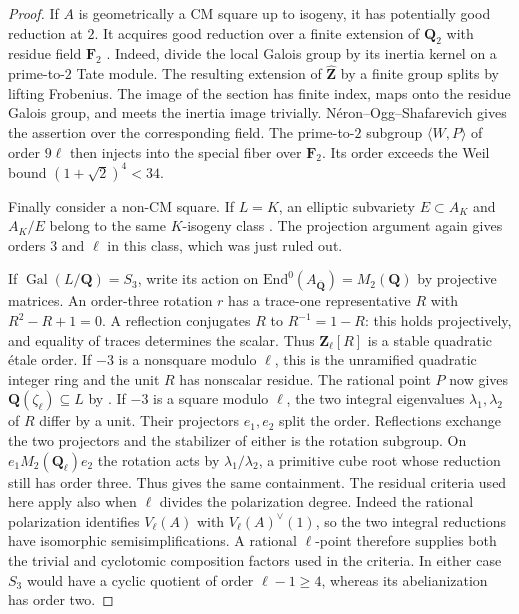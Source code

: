\documentclass[11pt]{article}
\newcommand{\Q}{\mathbf Q}
\newcommand{\Z}{\mathbf Z}
\newcommand{\F}{\mathbf F}
\newcommand{\Gal}{\operatorname{Gal}}
\begin{document}
\begin{proof}
If $A$ is geometrically a CM square up to isogeny, it has potentially good reduction at $2$. It acquires good reduction over a finite extension of $\Q_2$ with residue field $\F_2$ \cite[input (I2)(c)]{T45}. Indeed, divide the local Galois group by its inertia kernel on a prime-to-$2$ Tate module. The resulting extension of $\widehat{\Z}$ by a finite group splits by lifting Frobenius. The image of the section has finite index, maps onto the residue Galois group, and meets the inertia image trivially. N\'eron--Ogg--Shafarevich gives the assertion over the corresponding field. The prime-to-$2$ subgroup $\langle W,P\rangle$ of order $9\ell$ then injects into the special fiber over $\F_2$. Its order exceeds the Weil bound $(1+\sqrt{2})^4<34$.

Finally consider a non-CM square. If $L=K$, an elliptic subvariety $E\subset A_K$ and $A_K/E$ belong to the same $K$-isogeny class \cite[input (I5)]{T45}. The projection argument again gives orders $3$ and $\ell$ in this class, which was just ruled out.

If $\Gal(L/\Q)=S_3$, write its action on $\mathrm{End}^0(A_{\overline{\Q}})=M_2(\Q)$ by projective matrices. An order-three rotation $r$ has a trace-one representative $R$ with $R^2-R+1=0$. A reflection conjugates $R$ to $R^{-1}=1-R$: this holds projectively, and equality of traces determines the scalar. Thus $\Z_\ell[R]$ is a stable quadratic \'etale order. If $-3$ is a nonsquare modulo $\ell$, this is the unramified quadratic integer ring and the unit $R$ has nonscalar residue. The rational point $P$ now gives $\Q(\zeta_\ell)\subseteq L$ by \cite[input (I6)(a)]{T45}. If $-3$ is a square modulo $\ell$, the two integral eigenvalues $\lambda_1,\lambda_2$ of $R$ differ by a unit. Their projectors $e_1,e_2$ split the order. Reflections exchange the two projectors and the stabilizer of either is the rotation subgroup. On $e_1 M_2(\Q_\ell)e_2$ the rotation acts by $\lambda_1/\lambda_2$, a primitive cube root whose reduction still has order three. Thus \cite[input (I6)(b)]{T45} gives the same containment. The residual criteria used here apply also when $\ell$ divides the polarization degree. Indeed the rational polarization identifies $V_\ell(A)$ with $V_\ell(A)^\vee(1)$, so the two integral reductions have isomorphic semisimplifications. A rational $\ell$-point therefore supplies both the trivial and cyclotomic composition factors used in the criteria. In either case $S_3$ would have a cyclic quotient of order $\ell-1\ge4$, whereas its abelianization has order two.
\end{proof}
\end{document}
